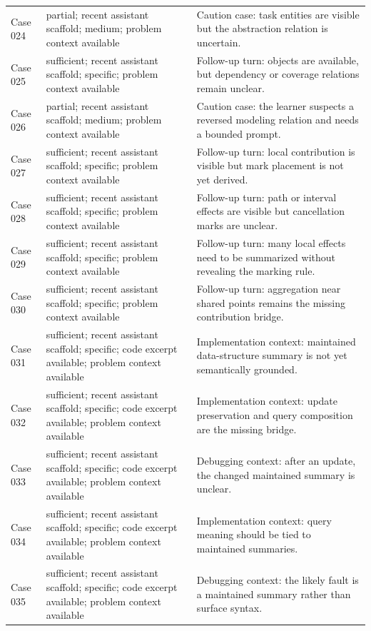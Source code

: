 \documentclass[11pt]{article}
\begin{document}
\begin{landscape}
\begin{xltabular}{\textwidth}{>{\raggedright\arraybackslash}p{0.08\textwidth}>{\raggedright\arraybackslash}p{0.34\textwidth}>{\raggedright\arraybackslash}X}
Case 024 & partial; recent assistant scaffold; medium; problem context available & Caution case: task entities are visible but the abstraction relation is uncertain. \\
Case 025 & sufficient; recent assistant scaffold; specific; problem context available & Follow-up turn: objects are available, but dependency or coverage relations remain unclear. \\
Case 026 & partial; recent assistant scaffold; medium; problem context available & Caution case: the learner suspects a reversed modeling relation and needs a bounded prompt. \\
Case 027 & sufficient; recent assistant scaffold; specific; problem context available & Follow-up turn: local contribution is visible but mark placement is not yet derived. \\
Case 028 & sufficient; recent assistant scaffold; specific; problem context available & Follow-up turn: path or interval effects are visible but cancellation marks are unclear. \\
Case 029 & sufficient; recent assistant scaffold; specific; problem context available & Follow-up turn: many local effects need to be summarized without revealing the marking rule. \\
Case 030 & sufficient; recent assistant scaffold; specific; problem context available & Follow-up turn: aggregation near shared points remains the missing contribution bridge. \\
Case 031 & sufficient; recent assistant scaffold; specific; code excerpt available; problem context available & Implementation context: maintained data-structure summary is not yet semantically grounded. \\
Case 032 & sufficient; recent assistant scaffold; specific; code excerpt available; problem context available & Implementation context: update preservation and query composition are the missing bridge. \\
Case 033 & sufficient; recent assistant scaffold; specific; code excerpt available; problem context available & Debugging context: after an update, the changed maintained summary is unclear. \\
Case 034 & sufficient; recent assistant scaffold; specific; code excerpt available; problem context available & Implementation context: query meaning should be tied to maintained summaries. \\
Case 035 & sufficient; recent assistant scaffold; specific; code excerpt available; problem context available & Debugging context: the likely fault is a maintained summary rather than surface syntax. \\

\end{xltabular}
\end{landscape}
\end{document}

